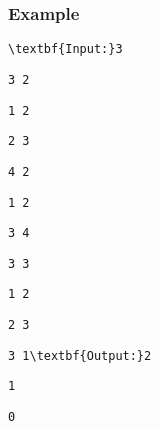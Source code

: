 \subsubsection{Example}
\begin{verbatim}
\textbf{Input:}3\end{verbatim}
\begin{verbatim}
3 2\end{verbatim}
\begin{verbatim}
1 2\end{verbatim}
\begin{verbatim}
2 3\end{verbatim}
\begin{verbatim}
4 2\end{verbatim}
\begin{verbatim}
1 2\end{verbatim}
\begin{verbatim}
3 4\end{verbatim}
\begin{verbatim}
3 3\end{verbatim}
\begin{verbatim}
1 2\end{verbatim}
\begin{verbatim}
2 3\end{verbatim}
\begin{verbatim}
3 1\textbf{Output:}2\end{verbatim}
\begin{verbatim}
1\end{verbatim}
\begin{verbatim}
0\end{verbatim}